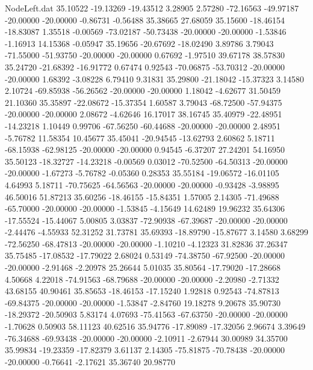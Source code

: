 \begin{filecontents}{NodeLeft.dat}
  35.10522  -19.13269  -19.43512     3.28905    2.57280  -72.16563  -49.97187  -20.00000  -20.00000   -0.86731   -0.56488   35.38665   27.68059
  35.15600  -18.46154  -18.83087     1.35518   -0.00569  -73.02187  -50.73438  -20.00000  -20.00000   -1.53846   -1.16913   14.15368   -0.05947
  35.19656  -20.67692  -18.02490     3.89786    3.79043  -71.55000  -51.93750  -20.00000  -20.00000    0.67692   -1.97510   39.67178   38.57830
  35.24720  -21.68392  -16.91772     0.67474    0.92543  -70.06875  -53.70312  -20.00000  -20.00000    1.68392   -3.08228    6.79410    9.31831
  35.29800  -21.18042  -15.37323     3.14580    2.10724  -69.85938  -56.26562  -20.00000  -20.00000    1.18042   -4.62677   31.50459   21.10360
  35.35897  -22.08672  -15.37354     1.60587    3.79043  -68.72500  -57.94375  -20.00000  -20.00000    2.08672   -4.62646   16.17017   38.16745
  35.40979  -22.48951  -14.23218     1.10449    0.99706  -67.56250  -60.44688  -20.00000  -20.00000    2.48951   -5.76782   11.58354   10.45677
  35.45041  -20.94545  -13.62793     2.60862    5.18711  -68.15938  -62.98125  -20.00000  -20.00000    0.94545   -6.37207   27.24201   54.16950
  35.50123  -18.32727  -14.23218    -0.00569    0.03012  -70.52500  -64.50313  -20.00000  -20.00000   -1.67273   -5.76782   -0.05360    0.28353
  35.55184  -19.06572  -16.01105     4.64993    5.18711  -70.75625  -64.56563  -20.00000  -20.00000   -0.93428   -3.98895   46.50016   51.87213
  35.60256  -18.46155  -15.84351     1.57005    2.14305  -71.49688  -65.70000  -20.00000  -20.00000   -1.53845   -4.15649   14.62489   19.96232
  35.64306  -17.55524  -15.44067     5.00805    3.03837  -72.90938  -67.39687  -20.00000  -20.00000   -2.44476   -4.55933   52.31252   31.73781
  35.69393  -18.89790  -15.87677     3.14580    3.68299  -72.56250  -68.47813  -20.00000  -20.00000   -1.10210   -4.12323   31.82836   37.26347
  35.75485  -17.08532  -17.79022     2.68024    0.53149  -74.38750  -67.92500  -20.00000  -20.00000   -2.91468   -2.20978   25.26644    5.01035
  35.80564  -17.79020  -17.28668     4.50668    4.22018  -74.91563  -68.79688  -20.00000  -20.00000   -2.20980   -2.71332   43.68155   40.90461
  35.85653  -18.46153  -17.15240     1.92818    0.92543  -74.87813  -69.84375  -20.00000  -20.00000   -1.53847   -2.84760   19.18278    9.20678
  35.90730  -18.29372  -20.50903     5.83174    4.07693  -75.41563  -67.63750  -20.00000  -20.00000   -1.70628    0.50903   58.11123   40.62516
  35.94776  -17.89089  -17.32056     2.96674    3.39649  -76.34688  -69.93438  -20.00000  -20.00000   -2.10911   -2.67944   30.00989   34.35700
  35.99834  -19.23359  -17.82379     3.61137    2.14305  -75.81875  -70.78438  -20.00000  -20.00000   -0.76641   -2.17621   35.36740   20.98770

\end{filecontents}
